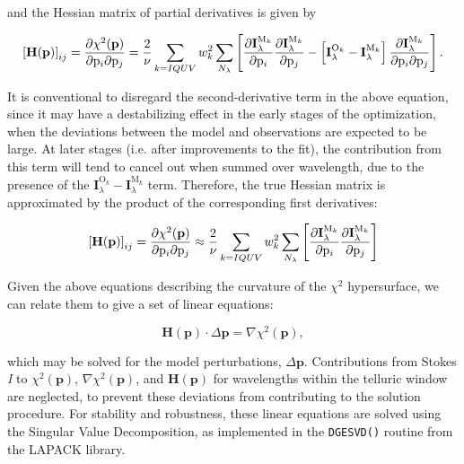 \documentclass[11pt]{article}
\begin{document}
and the Hessian matrix of partial derivatives is given by

\begin{equation}
\left[\mathbf{H}(\mathbf{p})\right]_{ij} = \frac{\partial{\chi^{2}(\mathbf{p})}}{\partial{\mathrm{p}_{i}}\partial{\mathrm{p}_{j}}} =
\frac{2}{\nu}\displaystyle\sum\limits_{k=IQUV}w_{k}^{2}\displaystyle\sum\limits_{N_{\lambda}}\left[\frac{\partial{\mathbf{I}_{\lambda}^{\mathrm{M}_{k}}}}{\partial{\mathrm{p}_{i}}}
\frac{\partial{\mathbf{I}_{\lambda}^{\mathrm{M}_{k}}}}{\partial{\mathrm{p}_{j}}}-\left[\mathbf{I}_{\lambda}^{\mathrm{O}_{k}}-
\mathbf{I}_{\lambda}^{\mathrm{M}_{k}}\right]\frac{\partial{\mathbf{I}_{\lambda}^{\mathrm{M}_{k}}}}{\partial{\mathrm{p}_{i}}\partial{\mathrm{p}_{j}}}\right].
\end{equation}

It is conventional to disregard the second-derivative term in the above equation, since it may have a
destabilizing effect in the early stages of the optimization, when the deviations between the model
and observations are expected to be large.  At later stages (i.e. after improvements to the fit), the
contribution from this term will tend to cancel out when summed over wavelength, due to the presence of
the $\mathbf{I}_{\lambda}^{\mathrm{O}_{k}}-\mathbf{I}_{\lambda}^{\mathrm{M}_{k}}$ term.  Therefore, the
true Hessian matrix is approximated by the product of the corresponding first derivatives:

\begin{equation}
\left[\mathbf{H}(\mathbf{p})\right]_{ij} = \frac{\partial{\chi^{2}(\mathbf{p})}}{\partial{\mathrm{p}_{i}}\partial{\mathrm{p}_{j}}} \approx
\frac{2}{\nu}\displaystyle\sum\limits_{k=IQUV}w_{k}^{2}\displaystyle\sum\limits_{N_{\lambda}}\left[\frac{\partial{\mathbf{I}_{\lambda}^{\mathrm{M}_{k}}}}{\partial{\mathrm{p}_{i}}}
\frac{\partial{\mathbf{I}_{\lambda}^{\mathrm{M}_{k}}}}{\partial{\mathrm{p}_{j}}}\right]
\end{equation}

Given the above equations describing the curvature of the $\chi^{2}$ hypersurface, we can relate them to
give a set of linear equations:

\begin{equation}\label{eqn:pert}
\mathbf{H}(\mathbf{p}) \cdot \Delta\mathbf{p} = \nabla\chi^{2}(\mathbf{p}),
\end{equation}

which may be solved for the model perturbations, $\Delta\mathbf{p}$.  Contributions from Stokes \textit{I} to
$\chi^{2}(\mathbf{p})$, $\nabla\chi^{2}(\mathbf{p})$, and $\mathbf{H}(\mathbf{p})$ for wavelengths within the
telluric window are neglected, to prevent these deviations from contributing to the solution procedure.  For 
stability and robustness, these linear equations are solved using the Singular Value Decomposition, as
implemented in the \texttt{DGESVD()} routine from the LAPACK library.\\
\end{document}

